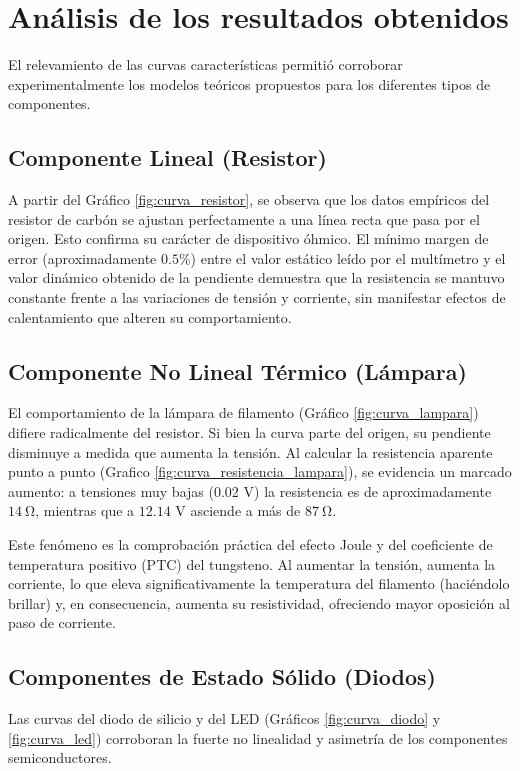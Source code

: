 \section{Análisis de los resultados obtenidos}

El relevamiento de las curvas características permitió corroborar experimentalmente los modelos teóricos propuestos para los diferentes tipos de componentes.

\subsection{Componente Lineal (Resistor)}
A partir del Gráfico \ref{fig:curva_resistor}, se observa que los datos empíricos del resistor de carbón se ajustan perfectamente a una línea recta que pasa por el origen. Esto confirma su carácter de dispositivo óhmico. El mínimo margen de error (aproximadamente $0.5\%$) entre el valor estático leído por el multímetro y el valor dinámico obtenido de la pendiente demuestra que la resistencia se mantuvo constante frente a las variaciones de tensión y corriente, sin manifestar efectos de calentamiento que alteren su comportamiento.

\subsection{Componente No Lineal Térmico (Lámpara)}
El comportamiento de la lámpara de filamento (Gráfico \ref{fig:curva_lampara}) difiere radicalmente del resistor. Si bien la curva parte del origen, su pendiente disminuye a medida que aumenta la tensión. Al calcular la resistencia aparente punto a punto (Grafico \ref{fig:curva_resistencia_lampara}), se evidencia un marcado aumento: a tensiones muy bajas ($0.02$ V) la resistencia es de aproximadamente $\SI{14}{\ohm}$, mientras que a $12.14$ V asciende a más de $\SI{87}{\ohm}$. 

Este fenómeno es la comprobación práctica del efecto Joule y del coeficiente de temperatura positivo (PTC) del tungsteno. Al aumentar la tensión, aumenta la corriente, lo que eleva significativamente la temperatura del filamento (haciéndolo brillar) y, en consecuencia, aumenta su resistividad, ofreciendo mayor oposición al paso de corriente.

\subsection{Componentes de Estado Sólido (Diodos)}
Las curvas del diodo de silicio y del LED (Gráficos \ref{fig:curva_diodo} y \ref{fig:curva_led}) corroboran la fuerte no linealidad y asimetría de los componentes semiconductores.

